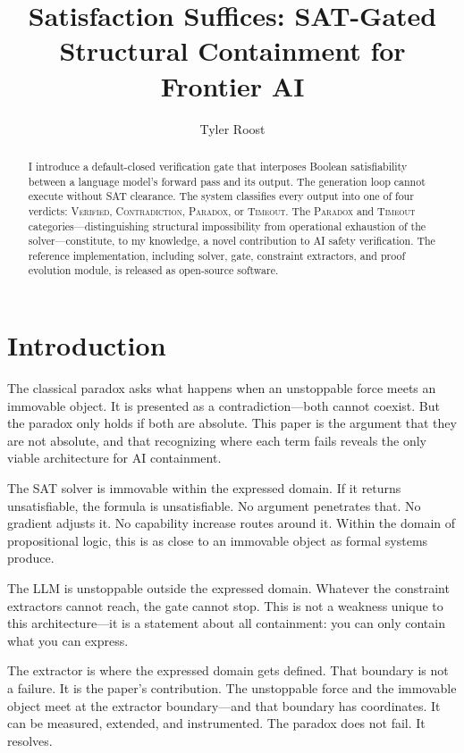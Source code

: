 \documentclass[11pt,a4paper]{article}
\title{Satisfaction Suffices: SAT-Gated Structural Containment for Frontier AI}
\author{Tyler Roost}
\date{}
\begin{document}
\maketitle

\begin{abstract}
I introduce a default-closed verification gate that interposes Boolean satisfiability between a language model's forward pass and its output.
The generation loop cannot execute without SAT clearance.
The system classifies every output into one of four verdicts: \textsc{Verified}, \textsc{Contradiction}, \textsc{Paradox}, or \textsc{Timeout}.
The \textsc{Paradox} and \textsc{Timeout} categories---distinguishing structural impossibility from operational exhaustion of the solver---constitute, to my knowledge, a novel contribution to AI safety verification.
The reference implementation, including solver, gate, constraint extractors, and proof evolution module, is released as open-source software.
\end{abstract}

\section{Introduction}

The classical paradox asks what happens when an unstoppable force meets an immovable object.
It is presented as a contradiction---both cannot coexist.
But the paradox only holds if both are absolute.
This paper is the argument that they are not absolute, and that recognizing where each term fails reveals the only viable architecture for AI containment.

The SAT solver is immovable within the expressed domain.
If it returns unsatisfiable, the formula is unsatisfiable.
No argument penetrates that.
No gradient adjusts it.
No capability increase routes around it.
Within the domain of propositional logic, this is as close to an immovable object as formal systems produce.

The LLM is unstoppable outside the expressed domain.
Whatever the constraint extractors cannot reach, the gate cannot stop.
This is not a weakness unique to this architecture---it is a statement about all containment: you can only contain what you can express.

The extractor is where the expressed domain gets defined.
That boundary is not a failure.
It is the paper's contribution.
The unstoppable force and the immovable object meet at the extractor boundary---and that boundary has coordinates.
It can be measured, extended, and instrumented.
The paradox does not fail.
It resolves.
\end{document}
